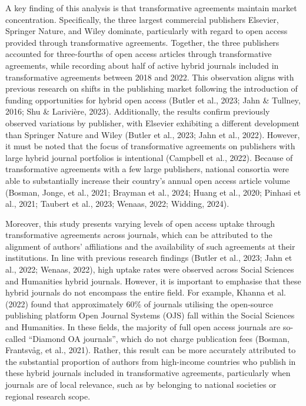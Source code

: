 \documentclass[a4paper,man,floatsintext,longtable,noextraspace,12pt]{apa6}
\begin{document}
A key finding of this analysis is that transformative agreements
maintain market concentration. Specifically, the three largest
commercial publishers Elsevier, Springer Nature, and Wiley dominate,
particularly with regard to open access provided through transformative
agreements. Together, the three publishers accounted for three-fourths
of open access articles through transformative agreements, while
recording about half of active hybrid journals included in
transformative agreements between 2018 and 2022. This observation aligns
with previous research on shifts in the publishing market following the
introduction of funding opportunities for hybrid open access (Butler et
al., 2023; Jahn \& Tullney, 2016; Shu \& Larivière, 2023). Additionally,
the results confirm previously observed variations by publisher, with
Elsevier exhibiting a different development than Springer Nature and
Wiley (Butler et al., 2023; Jahn et al., 2022). However, it must be
noted that the focus of transformative agreements on publishers with
large hybrid journal portfolios is intentional (Campbell et al., 2022).
Because of transformative agreements with a few large publishers,
national consortia were able to substantially increase their country's
annual open access article volume (Bosman, Jonge, et al., 2021; Brayman
et al., 2024; Huang et al., 2020; Pinhasi et al., 2021; Taubert et al.,
2023; Wenaas, 2022; Widding, 2024).

Moreover, this study presents varying levels of open access uptake
through transformative agreements across journals, which can be
attributed to the alignment of authors' affiliations and the
availability of such agreements at their institutions. In line with
previous research findings (Butler et al., 2023; Jahn et al., 2022;
Wenaas, 2022), high uptake rates were observed across Social Sciences
and Humanities hybrid journals. However, it is important to emphasise
that these hybrid journals do not encompass the entire field. For
example, Khanna et al. (2022) found that approximately 60\% of journals
utilising the open-source publishing platform Open Journal Systems (OJS)
fall within the Social Sciences and Humanities. In these fields, the
majority of full open access journals are so-called ``Diamond OA
journals'', which do not charge publication fees (Bosman, Frantsvåg, et
al., 2021). Rather, this result can be more accurately attributed to the
substantial proportion of authors from high-income countries who publish
in these hybrid journals included in transformative agreements,
particularly when journals are of local relevance, such as by belonging
to national societies or regional research scope.
\end{document}
